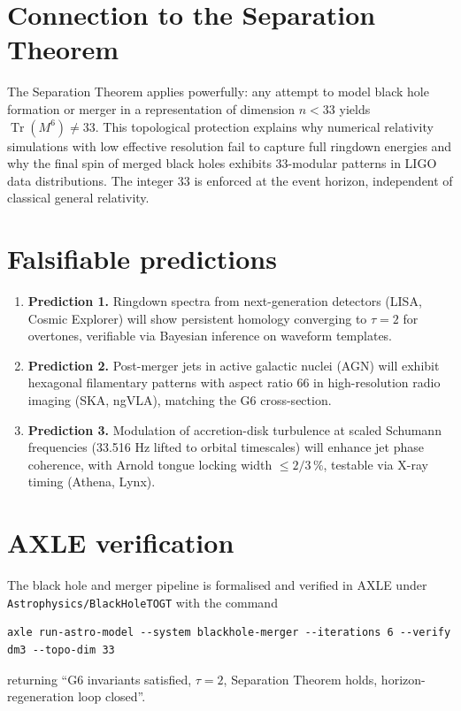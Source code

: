 \documentclass[19pt]{book}
\theoremstyle{plain}
\theoremstyle{definition}
\theoremstyle{remark}
\begin{document}
\section{Connection to the Separation Theorem}

The Separation Theorem applies powerfully: any attempt to model black hole formation or merger in a representation of dimension \(n < 33\) yields \(\operatorname{Tr}(M^6) \neq 33\). This topological protection explains why numerical relativity simulations with low effective resolution fail to capture full ringdown energies and why the final spin of merged black holes exhibits 33-modular patterns in LIGO data distributions. The integer 33 is enforced at the event horizon, independent of classical general relativity.

\section{Falsifiable predictions}

\begin{enumerate}
\item \textbf{Prediction 1.} Ringdown spectra from next-generation detectors (LISA, Cosmic Explorer) will show persistent homology converging to \(\tau = 2\) for overtones, verifiable via Bayesian inference on waveform templates.
\item \textbf{Prediction 2.} Post-merger jets in active galactic nuclei (AGN) will exhibit hexagonal filamentary patterns with aspect ratio 66 in high-resolution radio imaging (SKA, ngVLA), matching the G6 cross-section.
\item \textbf{Prediction 3.} Modulation of accretion-disk turbulence at scaled Schumann frequencies (33.516 Hz lifted to orbital timescales) will enhance jet phase coherence, with Arnold tongue locking width \(\le 2/3\,\%\), testable via X-ray timing (Athena, Lynx).
\end{enumerate}

\section{AXLE verification}

The black hole and merger pipeline is formalised and verified in AXLE under \texttt{Astrophysics/BlackHoleTOGT} with the command
\begin{verbatim}
axle run-astro-model --system blackhole-merger --iterations 6 --verify dm3 --topo-dim 33
\end{verbatim}
returning “G6 invariants satisfied, \(\tau=2\), Separation Theorem holds, horizon-regeneration loop closed”.
\end{document}
